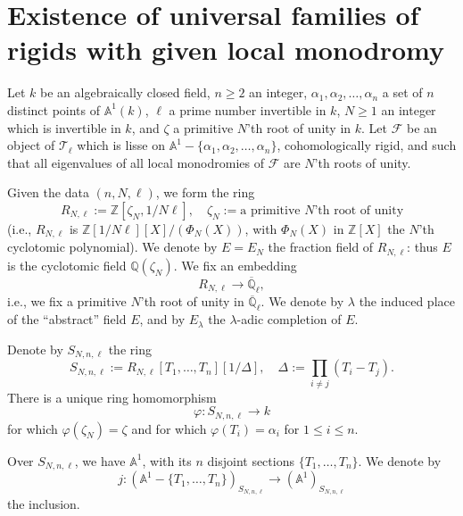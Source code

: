 \section[Universal families of rigids]{Existence of universal families of rigids with given local monodromy}
\label{sec:5.5}

Let \(k\) be an algebraically closed field, \(n\geq 2\) an integer,
\(\alpha_1,\alpha_2,\ldots,\alpha_n\) a set of \(n\) distinct points of
\(\mathbb{A}^1(k)\), \(\ell\) a prime number invertible in \(k\), \(N\geq 1\)
an integer which is invertible in \(k\), and \(\zeta\) a primitive \(N\)'th root
of unity in \(k\). Let \(\mathcal{F}\) be an object of \(\mathcal{T}_\ell\)
which is lisse on
\(\mathbb{A}^1-\{\alpha_1,\alpha_2,\ldots,\alpha_n\}\), cohomologically rigid,
and such that all eigenvalues of all local monodromies of \(\mathcal{F}\) are
\(N\)'th roots of unity.

Given the data \((n,N,\ell)\), we form the ring
\[
  R_{N,\ell}:=\mathbb{Z}[\zeta_N,1/N\ell],
  \quad \zeta_N:=\text{a primitive \(N\)'th root of unity}
\]
(i.e., \(R_{N,\ell}\) is
\(\mathbb{Z}[1/N\ell][X]/(\Phi_N(X))\), with \(\Phi_N(X)\) in
\(\mathbb{Z}[X]\) the \(N\)'th cyclotomic polynomial). We denote by
\(E=E_N\) the fraction field of \(R_{N,\ell}\): thus \(E\) is the cyclotomic
field \(\mathbb{Q}(\zeta_N)\). We fix an embedding
\[
  R_{N,\ell}\to\overline{\mathbb{Q}}_\ell,
\]
i.e., we fix a primitive \(N\)'th root of unity in
\(\overline{\mathbb{Q}}_\ell\). We denote by \(\lambda\) the induced place of
the ``abstract'' field \(E\), and by \(E_\lambda\) the \(\lambda\)-adic
completion of \(E\).

Denote by \(S_{N,n,\ell}\) the ring
\[
  S_{N,n,\ell}:=
  R_{N,\ell}[T_1,\ldots,T_n][1/\Delta],
  \quad
  \Delta:=\prod_{i\neq j}(T_i-T_j).
\]
There is a unique ring homomorphism
\[
  \varphi:S_{N,n,\ell}\to k
\]
for which \(\varphi(\zeta_N)=\zeta\) and for which
\(\varphi(T_i)=\alpha_i\) for \(1\leq i\leq n\).

Over \(S_{N,n,\ell}\), we have \(\mathbb{A}^1\), with its \(n\) disjoint
sections \(\{T_1,\ldots,T_n\}\). We denote by
\[
  j:(\mathbb{A}^1-\{T_1,\ldots,T_n\})_{S_{N,n,\ell}}
  \to
  (\mathbb{A}^1)_{S_{N,n,\ell}}
\]
the inclusion.

